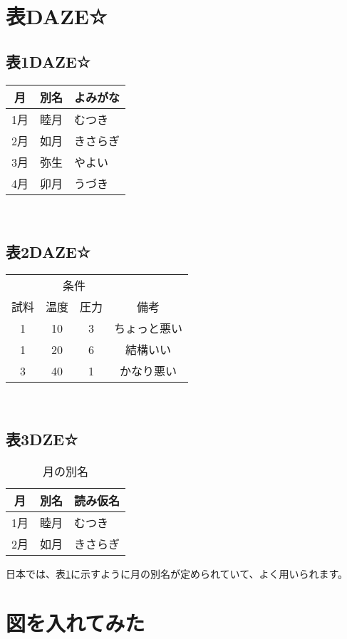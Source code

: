 \documentclass[a4paper, uplatex]{jlreq}
\newcommand{\明石}{明石工業高等専門がおっこう電機情報工学科}
\begin{document}
	\section{表DAZE☆}
	\subsection{表1DAZE☆} 
	\begin{tabular}{|c|l|p{15mm}|} \hline
		月& 別名& よみがな\\ \hline\hline
		1月& 睦月& むつき\\
		2月& 如月& きさらぎ\\
		3月& 弥生& やよい\\
		4月& 卯月& うづき\\ \hline 
	\end{tabular} \\
	\subsection{表2DAZE☆}
	\begin{tabular}{|c|c|c|c|}\hline
		& \multicolumn{2}{|c|}{条件} & \\ \cline{2-3}
		試料& 温度 & 圧力 & 備考 \\ \hline
		1 & 10 & 3 & ちょっと悪い \\ \hline
		1 & 20 & 6 & 結構いい\\
		3 & 40 & 1 & かなり悪い　\\ \hline
	\end{tabular} \\
	\subsection{表3DZE☆}
	\begin{table}[http]
		\centering
		\caption{月の別名}
		\label{month-name}
		\begin{tabular}[t]{|c|l|p{15mm}|}\hline
			月& 別名& 読み仮名\\ \hline\hline
			1月& 睦月& むつき\\
			2月& 如月& きさらぎ\\ \hline
		\end{tabular}
	\end{table}
	日本では、表\ref{month-name}に示すように月の別名が定められていて、よく用いられます。
	
	\newpage
	\section{図を入れてみた}
\end{document}
